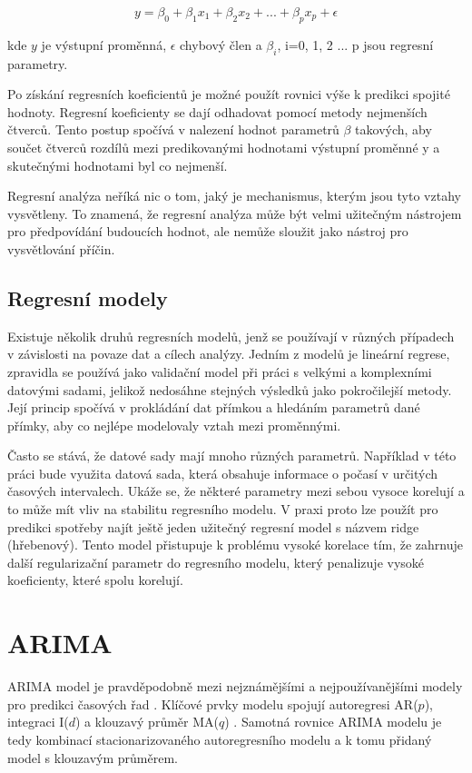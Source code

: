 \documentclass[FM,BP,fonts]{tulthesis}
\begin{document}
\begin{equation}
	y = \beta_0 + \beta_1x_1 + \beta_2x_2 + ... + \beta_px_p +  \epsilon
\end{equation}

kde $y$ je výstupní proměnná, $\epsilon$ chybový člen a $\beta_i$, i=0, 1, 2 ... p jsou regresní parametry.

Po získání regresních koeficientů je možné použít rovnici výše k predikci spojité hodnoty. Regresní koeficienty se dají odhadovat pomocí metody nejmenších čtverců. Tento postup spočívá v nalezení hodnot parametrů $\beta$ takových, aby součet čtverců rozdílů mezi predikovanými hodnotami výstupní proměnné y a skutečnými hodnotami byl co nejmenší. \cite{hanousek1992moderni}

Regresní analýza neříká nic o tom, jaký je mechanismus, kterým jsou tyto vztahy vysvětleny. To znamená, že regresní analýza může být velmi užitečným nástrojem pro předpovídání budoucích hodnot, ale nemůže sloužit jako nástroj pro vysvětlování příčin.

\subsection{Regresní modely}
Existuje několik druhů regresních modelů, jenž se používají v různých případech v závislosti na povaze dat a cílech analýzy. Jedním z modelů je lineární regrese, zpravidla se používá jako validační model při práci s velkými a komplexními datovými sadami, jelikož nedosáhne stejných výsledků jako pokročilejší metody. Její princip spočívá v prokládání dat přímkou a hledáním parametrů dané přímky, aby co nejlépe modelovaly vztah mezi proměnnými.

Často se stává, že datové sady mají mnoho různých parametrů. Například v této práci bude využita datová sada, která obsahuje informace o počasí v určitých časových intervalech. Ukáže se, že některé parametry mezi sebou vysoce korelují a to může mít vliv na stabilitu regresního modelu. V praxi proto lze použít pro predikci spotřeby najít ještě jeden užitečný regresní model s názvem ridge (hřebenový). Tento model přistupuje k problému vysoké korelace tím, že zahrnuje další regularizační parametr do regresního modelu, který penalizuje vysoké koeficienty, které spolu korelují.

\section{ARIMA}
ARIMA model je pravděpodobně mezi nejznámějšími a nejpoužívanějšími modely pro predikci časových řad \cite{RUPEL}. Klíčové prvky modelu spojují autoregresi AR($p$), integraci I($d$) a klouzavý průměr MA($q$) \cite{Brockwell2016-qt}. Samotná rovnice ARIMA modelu je tedy kombinací stacionarizovaného autoregresního modelu a k tomu přidaný model s klouzavým průměrem.
\end{document}
